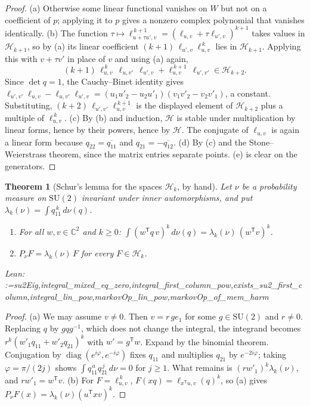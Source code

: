 \documentclass[11pt]{amsart}
\makeatletter
\newtheorem{theorem}{Theorem}[section]
\theoremstyle{definition}
\theoremstyle{remark}
\newcommand{\@leanlist}[1]{\def\@leansep{}\@for\@leanname:=#1\do{\@leansep
  \texttt{\expandafter\detokenize\expandafter{\@leanname}}\def\@leansep{, }}}
\newcommand{\lean}[1]{\par\smallskip\noindent
  {\footnotesize\normalfont\raggedright\textsf{Lean:} \@leanlist{#1}\par}}
\newcommand{\C}{\mathbb{C}}
\newcommand{\transp}{^{\mathsf T}}
\makeatother
\begin{document}
\begin{proof}
(a) Otherwise some linear functional vanishes on $W$ but not on a coefficient of $p$; applying
it to $p$ gives a nonzero complex polynomial that vanishes identically.  (b) The function
$\tau\mapsto\ell_{u+\tau u',v}^{\,k+1}=(\ell_{u,v}+\tau\ell_{u',v})^{k+1}$ takes values in
$\mathcal H_{k+1}$, so by (a) its linear coefficient $(k+1)\,\ell_{u',v}\ell_{u,v}^{\,k}$ lies in
$\mathcal H_{k+1}$.  Applying this with $v+\tau v'$ in place of $v$ and using (a) again,
\[
  (k+1)\,\ell_{u,v}^{\,k}\,\ell_{u,v'}\,\ell_{u',v}+\ell_{u,v}^{\,k+1}\,\ell_{u',v'}\in\mathcal H_{k+2}.
\]
Since $\det q=1$, the Cauchy--Binet identity gives
$\ell_{u',v'}\ell_{u,v}-\ell_{u,v'}\ell_{u',v}=(u_1u'_2-u_2u'_1)(v_1v'_2-v_2v'_1)$, a constant.
Substituting, $(k+2)\,\ell_{u',v'}\ell_{u,v}^{\,k+1}$ is the displayed element of
$\mathcal H_{k+2}$ plus a multiple of $\ell_{u,v}^{\,k}$.  (c) By (b) and induction, $\mathcal H$
is stable under multiplication by linear forms, hence by their powers, hence by $\mathcal H$.
The conjugate of $\ell_{u,v}$ is again a linear form because $q_{22}=\overline{q_{11}}$ and
$q_{21}=-\overline{q_{12}}$.  (d) By (c) and the Stone--Weierstrass theorem, since the matrix
entries separate points.  (e) is clear on the generators.
\end{proof}

\begin{theorem}[Schur's lemma for the spaces $\mathcal H_k$, by hand]\label{thm:su2-schur}
Let $\nu$ be a probability measure on $\mathrm{SU}(2)$ invariant under inner automorphisms, and
put $\lambda_k(\nu)=\int q_{11}^{\,k}\,d\nu(q)$.
\begin{enumerate}
\item[(a)] For all $w,v\in\C^2$ and $k\ge0$:
$\displaystyle\int(w\transp q\,v)^k\,d\nu(q)=\lambda_k(\nu)\,(w\transp v)^k$.
\item[(b)] $P_\nu F=\lambda_k(\nu)\,F$ for every $F\in\mathcal H_k$.
\end{enumerate}
\lean{su2Eig,integral_mixed_eq_zero,integral_first_column_pow,exists_su2_first_column,integral_lin_pow,markovOp_lin_pow,markovOp_of_mem_harm}
\end{theorem}

\begin{proof}
(a) We may assume $v\ne0$.  Then $v=r\,ge_1$ for some $g\in\mathrm{SU}(2)$ and $r\ne0$.
Replacing $q$ by $gqg^{-1}$, which does not change the integral, the integrand becomes
$r^k(w'_1q_{11}+w'_2q_{21})^k$ with $w'=g\transp w$.  Expand by the binomial theorem.
Conjugation by $\operatorname{diag}(e^{i\varphi},e^{-i\varphi})$ fixes $q_{11}$ and multiplies
$q_{21}$ by $e^{-2i\varphi}$; taking $\varphi=\pi/(2j)$ shows
$\int q_{11}^{\,a}q_{21}^{\,j}\,d\nu=0$ for $j\ge1$.  What remains is
$(rw'_1)^k\lambda_k(\nu)$, and $rw'_1=w\transp v$.  (b) For $F=\ell_{u,v}^{\,k}$,
$F(xq)=\ell_{x\transp u,v}(q)^k$, so (a) gives $P_\nu F(x)=\lambda_k(\nu)(u\transp xv)^k$.
\end{proof}
\end{document}
